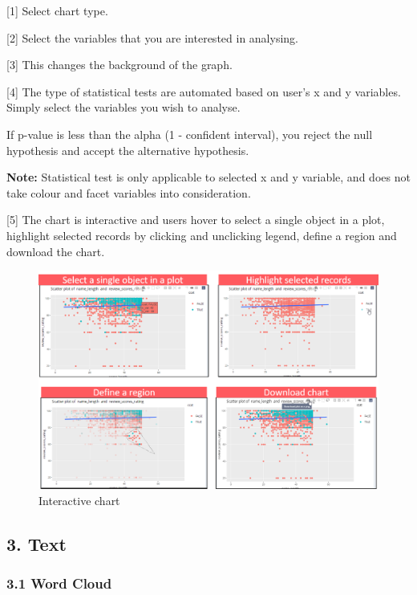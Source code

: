 \documentclass[
  12pt,
]{article}
\begin{document}
{[}1{]} Select chart type.

{[}2{]} Select the variables that you are interested in analysing.

{[}3{]} This changes the background of the graph.

{[}4{]} The type of statistical tests are automated based on user's x
and y variables. Simply select the variables you wish to analyse.

If p-value is less than the alpha (1 - confident interval), you reject
the null hypothesis and accept the alternative hypothesis.

\textbf{Note:} Statistical test is only applicable to selected x and y
variable, and does not take colour and facet variables into
consideration.

{[}5{]} The chart is interactive and users hover to select a single
object in a plot, highlight selected records by clicking and unclicking
legend, define a region and download the chart.

\begin{figure}[H]

{\centering \includegraphics[width=1\linewidth]{images/explore3} 

}

\caption{Interactive chart}\label{fig:unnamed-chunk-10}
\end{figure}

\hypertarget{text}{%
\subsection{3. Text}\label{text}}

\hypertarget{word-cloud}{%
\subsubsection{3.1 Word Cloud}\label{word-cloud}}
\end{document}
